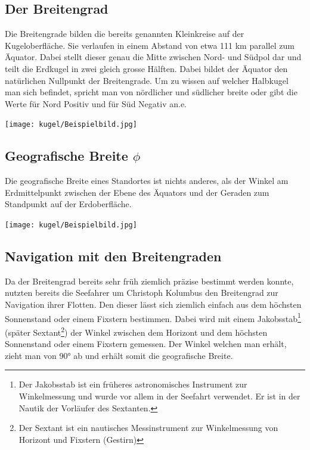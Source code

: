 \begin{refsection}
\section{Der Breitengrad}
Die Breitengrade bilden die bereits genannten Kleinkreise auf der Kugeloberfläche. Sie verlaufen in einem Abstand von etwa 111 km parallel zum Äquator. Dabei stellt dieser genau die Mitte zwischen Nord- und Südpol dar und teilt die Erdkugel in zwei gleich grosse Hälften. Dabei bildet der Äquator den natürlichen Nullpunkt der Breitengrade. Um zu wissen auf welcher Halbkugel man sich befindet, spricht man von nördlicher und südlicher breite oder gibt die Werte für Nord Positiv und für Süd Negativ an.e.

\begin{center}
        \texttt{[image: kugel/Beispielbild.jpg]}
\end{center}


\subsection{Geografische Breite $\phi$}
\begin{definition}
Die geografische Breite eines Standortes ist nichts anderes, als der Winkel am Erdmittelpunkt zwischen der Ebene des Äquators und der Geraden zum Standpunkt auf der Erdoberfläche.
\end{definition}

\begin{center}
        \texttt{[image: kugel/Beispielbild.jpg]}
\end{center}


\subsection{Navigation mit den Breitengraden}  \label{BreitengradM}
Da der Breitengrad bereits sehr früh ziemlich präzise bestimmt werden konnte, nutzten bereits die Seefahrer um Christoph Kolumbus den Breitengrad zur Navigation ihrer Flotten.
Den dieser lässt sich ziemlich einfach aus dem höchsten Sonnenstand oder einem Fixstern bestimmen. Dabei wird mit einem Jakobsstab\footnote{%
Der Jakobsstab ist ein früheres astronomisches Instrument zur Winkelmessung und wurde vor allem in der Seefahrt verwendet. Er ist in der Nautik der Vorläufer des Sextanten.} (später Sextant\footnote{%
Der Sextant ist ein nautisches Messinstrument zur Winkelmessung von Horizont und Fixstern (Gestirn)}) der Winkel zwischen dem Horizont und dem höchsten Sonnenstand oder einem Fixstern gemessen. Der Winkel welchen man erhält, zieht man von 90° ab und erhält somit die geografische Breite. \\


\end{refsection}
